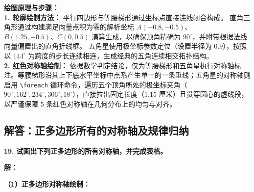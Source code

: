 \vspace{0.4cm}
{\small\color{blue!70!black}
\textbf{绘图原理与步骤：}\\
\textbf{1. 轮廓绘制方法：} 
平行四边形与等腰梯形通过坐标点直接连线闭合构成。
直角三角形通过构建满足向量点积为零的解析坐标 $A(-0.8, -0.5)$、$B(1.25, -0.5)、C(0, 0.5)$ 演算生成，以确保顶角精确为 $90^\circ$，并附带根据法线向量偏置出的直角折线框。
五角星使用极坐标参数定位（设置半径为 $0.9$），按照以 $144^\circ$ 为跨度的步长连续相连，生成经典的五角连续相交拓扑结构。\\
\textbf{2. 红色对称轴绘制：} 依据数学判定结论，仅为等腰梯形和五角星执行对称轴标注。等腰梯形沿其上下底水平坐标中点系产生单一的一条垂线；五角星的对称轴则启用 \texttt{\textbackslash{}foreach} 循环命令，遍历五个顶角所处的极坐标夹角（$90^\circ, 162^\circ, 234^\circ, 306^\circ, 18^\circ$），直接拉出固定长度（$1.15$ 厘米）且贯穿圆心的虚线段，以严谨保障 5 条红色对称轴在几何分布上的均匀与对齐。
}
\newpage

\newpage

\subsection{解答：正多边形所有的对称轴及规律归纳}

\vspace{0.6cm}

\textbf{\LARGE 19.} \textbf{试画出下列正多边形的所有对称轴，并完成表格。}

\vspace{0.4cm}
\textbf{解：}

\textbf{（1）正多边形对称轴绘制：}

